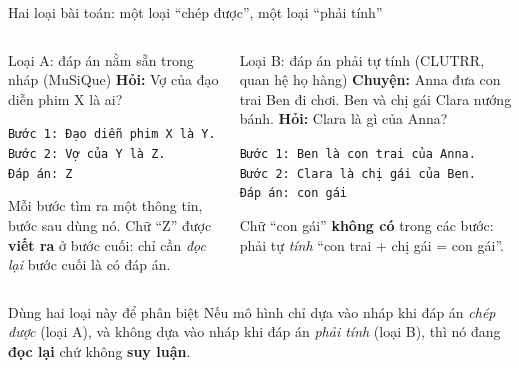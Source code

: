\documentclass[aspectratio=169,t]{beamer}
\newcommand{\code}[1]{\texttt{#1}}
\begin{document}
\begin{frame}[shrink]{Hai loại bài toán: một loại ``chép được'', một loại ``phải tính''}
\begin{columns}[T,onlytextwidth]
\begin{block}{Loại A: đáp án nằm sẵn trong nháp (MuSiQue)}
\scriptsize
\textbf{Hỏi:} Vợ của đạo diễn phim X là ai?\par\vspace{2pt}
\code{Bước 1: Đạo diễn phim X là Y.}\\
\code{Bước 2: Vợ của Y là Z.}\\
\code{Đáp án: Z}\par\vspace{2pt}
Mỗi bước tìm ra một thông tin, bước sau dùng nó. Chữ ``Z'' được \textbf{viết ra} ở bước cuối: chỉ cần \emph{đọc lại} bước cuối là có đáp án.
\end{block}
\begin{block}{Loại B: đáp án phải tự tính (CLUTRR, quan hệ họ hàng)}
\scriptsize
\textbf{Chuyện:} Anna đưa con trai Ben đi chơi. Ben và chị gái Clara nướng bánh. \textbf{Hỏi:} Clara là gì của Anna?\par\vspace{2pt}
\code{Bước 1: Ben là con trai của Anna.}\\
\code{Bước 2: Clara là chị gái của Ben.}\\
\code{Đáp án: con gái}\par\vspace{2pt}
Chữ ``con gái'' \textbf{không có} trong các bước: phải tự \emph{tính} ``con trai + chị gái = con gái''.
\end{block}
\end{columns}
\vspace{0.2cm}
\begin{alertblock}{Dùng hai loại này để phân biệt}
\footnotesize
Nếu mô hình chỉ dựa vào nháp khi đáp án \emph{chép được} (loại A), và không dựa vào nháp khi đáp án \emph{phải tính} (loại B), thì nó đang \textbf{đọc lại} chứ không \textbf{suy luận}.
\end{alertblock}
\par\kern0pt
\end{frame}
\end{document}
